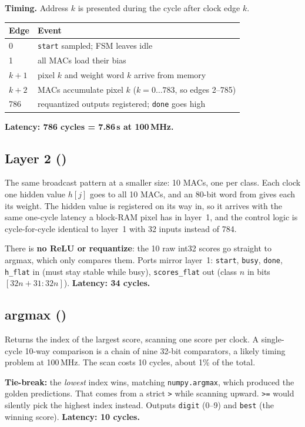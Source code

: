 \documentclass[11pt]{article}
\begin{document}
\textbf{Timing.} Address $k$ is presented during the cycle after clock edge $k$.
\begin{center}
\begin{tabular}{@{}ll@{}}
\toprule
Edge & Event \\
\midrule
0       & \texttt{start} sampled; FSM leaves idle \\
1       & all MACs load their bias \\
$k+1$   & pixel $k$ and weight word $k$ arrive from memory \\
$k+2$   & MACs accumulate pixel $k$ \quad ($k = 0 \ldots 783$, so edges 2--785) \\
786     & requantized outputs registered; \texttt{done} goes high \\
\bottomrule
\end{tabular}
\end{center}
\textbf{Latency: 786 cycles = 7.86\,\textmu s at 100\,MHz.}

\subsection{Layer 2 ()}
The same broadcast pattern at a smaller size: 10 MACs, one per class. Each clock
one hidden value $h[j]$ goes to all 10 MACs, and an 80-bit word from
 gives each its weight. The hidden value is registered on its
way in, so it arrives with the same one-cycle latency a block-RAM pixel has in
layer~1, and the control logic is cycle-for-cycle identical to layer~1 with
32 inputs instead of 784.

There is \textbf{no ReLU or requantize}: the 10 raw int32 scores go straight to
argmax, which only compares them. Ports mirror layer~1: \texttt{start},
\texttt{busy}, \texttt{done}, \texttt{h\_flat} in (must stay stable while busy),
\texttt{scores\_flat} out (class $n$ in bits $[32n{+}31{:}32n]$).
\textbf{Latency: 34 cycles.}

\subsection{argmax ()}
Returns the index of the largest score, scanning one score per clock. A
single-cycle 10-way comparison is a chain of nine 32-bit comparators, a likely
timing problem at 100\,MHz. The scan costs 10 cycles, about 1\% of the total.

\textbf{Tie-break:} the \emph{lowest} index wins, matching \texttt{numpy.argmax},
which produced the golden predictions. That comes from a strict \texttt{>} while
scanning upward. \texttt{>=} would silently pick the highest index instead.
Outputs \texttt{digit} (0--9) and \texttt{best} (the winning score).
\textbf{Latency: 10 cycles.}
\end{document}
